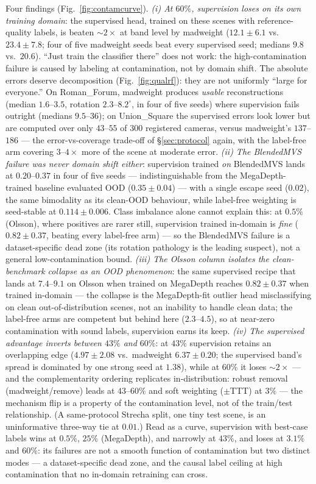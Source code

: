 \documentclass{article}
\newcommand{\mad}{madweight}
\renewcommand{\deg}{^{\circ}}
\begin{document}
Four findings (Fig.~\ref{fig:contamcurve}). \emph{(i) At $60\%$, supervision loses on its own training domain}: the
supervised head, trained on these scenes with reference-quality labels, is beaten
$\sim\!2\times$ at band level by \mad{} ($12.1\pm6.1$ vs.\ $23.4\pm7.8$; four of five
\mad{} seeds beat every supervised seed; medians $9.8$ vs.\ $20.6$). ``Just train the
classifier there'' does not work: the high-contamination failure is caused by labeling at
contamination, not by domain shift. The absolute errors deserve decomposition (Fig.~\ref{fig:qualrf}): they are
not uniformly ``large for everyone.'' On Roman\_Forum, \mad{} produces \emph{usable}
reconstructions (median $1.6$--$3.5$, rotation $2.3$--$8.2\deg$, in four of five seeds)
where supervision fails outright (medians $9.5$--$36$); on Union\_Square the supervised
errors look lower but are computed over only $43$--$55$ of $300$ registered cameras,
versus \mad{}'s $137$--$186$ --- the error-vs-coverage trade-off of
\S\ref{sec:protocol} again, with the label-free arm covering $3$--$4\times$ more of
the scene at moderate error. \emph{(ii) The BlendedMVS failure was never domain
shift either}: supervision trained \emph{on} BlendedMVS lands at $0.20$--$0.37$ in four
of five seeds --- indistinguishable from the MegaDepth-trained baseline evaluated OOD
($0.35\pm0.04$) --- with a single escape seed ($0.02$), the same bimodality as its
clean-OOD behaviour, while label-free weighting is seed-stable at $0.114\pm0.006$.
Class imbalance alone cannot explain this: at $0.5\%$ (Olsson), where positives are
rarer still, supervision trained in-domain is \emph{fine} ($0.82\pm0.37$, beating every
label-free arm) --- so the BlendedMVS failure is a dataset-specific dead zone (its
rotation pathology is the leading suspect), not a general low-contamination bound.
\emph{(iii) The Olsson column isolates the clean-benchmark collapse as an OOD
phenomenon}: the same supervised recipe that lands at $7.4$--$9.1$ on Olsson when
trained on MegaDepth reaches $0.82\pm0.37$ when trained in-domain --- the collapse is
the MegaDepth-fit outlier head misclassifying on clean out-of-distribution scenes, not
an inability to handle clean data; the label-free arms are competent but behind here
($2.3$--$4.5$), so at near-zero contamination with sound labels, supervision earns its
keep. \emph{(iv) The supervised advantage inverts between $43\%$ and $60\%$}: at $43\%$
supervision retains an overlapping edge ($4.97\pm2.08$ vs.\ \mad{} $6.37\pm0.20$;
the supervised band's spread is dominated by one strong seed at $1.38$), while at
$60\%$ it loses $\sim\!2\times$ --- and the complementarity ordering replicates
in-distribution: robust removal (\mad{}/remove) leads at $43$--$60\%$ and soft
weighting ($\pm$TTT) at $3\%$ --- the mechanism flip is a property of the contamination
level, not of the train/test relationship. (A same-protocol Strecha split, one tiny
test scene, is an uninformative three-way tie at $0.01$.) Read as a curve, supervision
with best-case labels wins at $0.5\%$, $25\%$ (MegaDepth), and narrowly at $43\%$, and
loses at $3.1\%$ and $60\%$: its failures are not a smooth function of contamination
but two distinct modes --- a dataset-specific dead zone, and the causal label ceiling
at high contamination that no in-domain retraining can cross.
\end{document}
